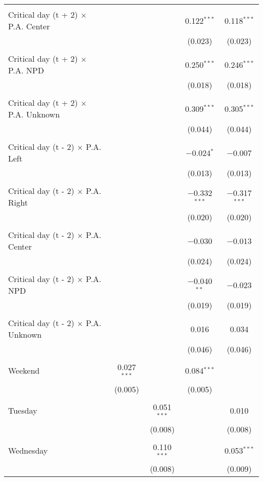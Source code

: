 \documentclass[
]{article}
\begin{document}
\begin{table}[!htbp]
{\begin{tabular}{@{\extracolsep{5pt}}lcccc}
  & & & & \\ 
 Critical day (t + 2) $\times$ P.A. Center &  &  & 0.122$^{***}$ & 0.118$^{***}$ \\ 
  &  &  & (0.023) & (0.023) \\ 
  & & & & \\ 
 Critical day (t + 2) $\times$ P.A. NPD &  &  & 0.250$^{***}$ & 0.246$^{***}$ \\ 
  &  &  & (0.018) & (0.018) \\ 
  & & & & \\ 
 Critical day (t + 2) $\times$ P.A. Unknown &  &  & 0.309$^{***}$ & 0.305$^{***}$ \\ 
  &  &  & (0.044) & (0.044) \\ 
  & & & & \\ 
 Critical day (t - 2) $\times$ P.A. Left &  &  & $-$0.024$^{*}$ & $-$0.007 \\ 
  &  &  & (0.013) & (0.013) \\ 
  & & & & \\ 
 Critical day (t - 2) $\times$ P.A. Right &  &  & $-$0.332$^{***}$ & $-$0.317$^{***}$ \\ 
  &  &  & (0.020) & (0.020) \\ 
  & & & & \\ 
 Critical day (t - 2) $\times$ P.A. Center &  &  & $-$0.030 & $-$0.013 \\ 
  &  &  & (0.024) & (0.024) \\ 
  & & & & \\ 
 Critical day (t - 2) $\times$ P.A. NPD &  &  & $-$0.040$^{**}$ & $-$0.023 \\ 
  &  &  & (0.019) & (0.019) \\ 
  & & & & \\ 
 Critical day (t - 2) $\times$ P.A. Unknown &  &  & 0.016 & 0.034 \\ 
  &  &  & (0.046) & (0.046) \\ 
  & & & & \\ 
 Weekend & 0.027$^{***}$ &  & 0.084$^{***}$ &  \\ 
  & (0.005) &  & (0.005) &  \\ 
  & & & & \\ 
 Tuesday &  & 0.051$^{***}$ &  & 0.010 \\ 
  &  & (0.008) &  & (0.008) \\ 
  & & & & \\ 
 Wednesday &  & 0.110$^{***}$ &  & 0.053$^{***}$ \\ 
  &  & (0.008) &  & (0.009) \\ 

\end{tabular}}
\end{table}
\end{document}
